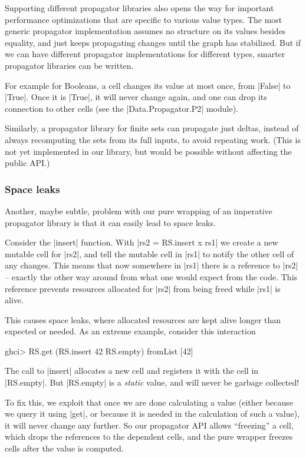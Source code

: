 \documentclass[manuscript,screen,acmsmall,nonacm]{acmart}
\begin{document}
Supporting different propagator libraries also opens the way for important performance optimizations that are specific to various value types. The most generic propagator implementation assumes no structure on its values besides equality, and just keeps propagating changes until the graph has stabilized. But if we can have different propagator implementations for different types, smarter propagator libraries can be written.

For example for Booleans, a cell changes its value at most once, from |False| to |True|. Once it is |True|, it will never change again, and one can drop its connection to other cells (see the |Data.Propagator.P2| module).

Similarly, a propagator library for finite sets can propagate just deltas, instead of always recomputing the sets from its full inputs, to avoid repeating work. (This is not yet implemented in our library, but would be possible without affecting the public API.)

\subsubsection{Space leaks}\label{sec:spaceleak}

Another, maybe subtle, problem with our pure wrapping of an imperative propagator library is that it can easily lead to space leaks.

Consider the |insert| function. With |rs2 = RS.insert x rs1| we create a new mutable cell for |rs2|, and tell the mutable cell in |rs1| to notify the other cell of any changes. This means that now somewhere in |rs1| there is a reference to |rs2| -- exactly the other way around from what one would expect from the code. This reference prevents resources allocated for |rs2| from being freed while |rs1| is alive.

This causes space leaks, where allocated resources are kept alive longer than expected or needed. As an extreme example, consider this interaction
\begin{code}
ghci> RS.get (RS.insert 42 RS.empty)
fromList [42]
\end{code}
The call to |insert| allocates a new cell and registers it with the cell in |RS.empty|. But |RS.empty| is a \emph{static} value, and will never be garbage collected!

To fix this, we exploit that once we are done calculating a value (either because we query it using |get|, or because it is needed in the calculation of such a value), it will never change any further. So our propagator API allows “freezing” a cell, which drops the references to the dependent cells, and the pure wrapper freezes cells after the value is computed.
\end{document}
